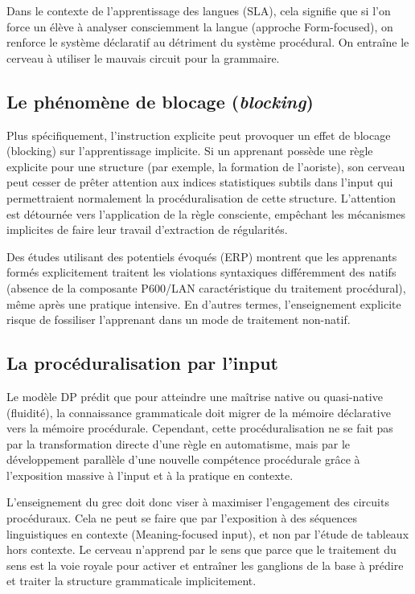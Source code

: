 Dans le contexte de l'apprentissage des langues (SLA), cela signifie que si l'on force un élève à
analyser consciemment la langue (approche Form-focused), on renforce le système déclaratif au
détriment du système procédural. On entraîne le cerveau à utiliser le \og mauvais\fg{} circuit pour
la grammaire.\cite{II-3-3-ref27}



\subsection{Le phénomène de blocage (\textit{blocking})}

Plus spécifiquement, l'instruction explicite peut provoquer un effet de \og blocage\fg{} (blocking)
sur l'apprentissage implicite. Si un apprenant possède une règle explicite pour une structure (par
exemple, la formation de l'aoriste), son cerveau peut cesser de prêter attention aux indices
statistiques subtils dans l'input qui permettraient normalement la procéduralisation de cette
structure.\cite{II-3-3-ref29} L'attention est détournée vers l'application de la règle consciente,
empêchant les mécanismes implicites de faire leur travail d'extraction de régularités.

Des études utilisant des potentiels évoqués (ERP) montrent que les apprenants formés explicitement
traitent les violations syntaxiques différemment des natifs (absence de la composante P600/LAN
caractéristique du traitement procédural), même après une pratique intensive.\cite{II-3-3-ref27} En
d'autres termes, l'enseignement explicite risque de fossiliser l'apprenant dans un mode de
traitement non-natif.



\subsection{La procéduralisation par l'input}

Le modèle DP prédit que pour atteindre une maîtrise native ou quasi-native (fluidité), la
connaissance grammaticale doit migrer de la mémoire déclarative vers la mémoire
procédurale.\cite{II-3-3-ref19} Cependant, cette \og procéduralisation\fg{} ne se fait pas par la
transformation directe d'une règle en automatisme, mais par le développement parallèle d'une
nouvelle compétence procédurale grâce à l'exposition massive à l'input et à la pratique en
contexte.\cite{II-3-3-ref31}

L'enseignement du grec doit donc viser à maximiser l'engagement des circuits procéduraux. Cela ne
peut se faire que par l'exposition à des séquences linguistiques en contexte (Meaning-focused
input), et non par l'étude de tableaux hors contexte.\cite{II-3-3-ref29} Le cerveau \og n'apprend
par le sens\fg{} que parce que le traitement du sens est la voie royale pour activer et entraîner
les ganglions de la base à prédire et traiter la structure grammaticale implicitement.



